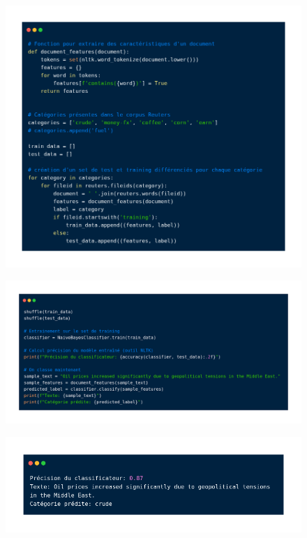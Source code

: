 \begin{frame}{\subsecname}
\begin{figure}[ht]
\includegraphics[scale=.27]{img/classifier1_nltk.png}

\end{figure}
\end{frame}

\begin{frame}{\subsecname}
\begin{figure}[ht]
\includegraphics[scale=.29]{img/classifier2_nltk.png}
\end{figure}
\end{frame}

\begin{frame}{\subsecname}
\begin{figure}[ht]
\includegraphics[scale=.36]{img/classifier_output_nltk.png}
\end{figure}
\end{frame}


